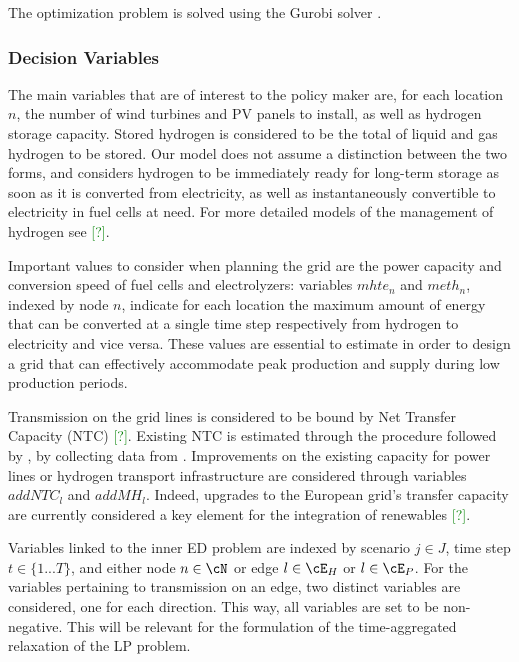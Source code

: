 The optimization problem is solved using the Gurobi solver \textcolor{green}{\cite{INTRO_gurobi}}.



\subsubsection{Decision Variables}

The main variables that are of interest to the policy maker are, for each location $n$, the number of wind turbines and PV panels to install, as well as hydrogen storage capacity.
Stored hydrogen is considered to be the total of liquid and gas hydrogen to be stored. 
Our model does not assume a distinction between the two forms, and considers hydrogen to be immediately ready for long-term storage as soon as it is converted from electricity, as well as instantaneously convertible to electricity in fuel cells at need. 
For more detailed models of the management of hydrogen see \textcolor{green}{[?]}.

Important values to consider when planning the grid are the power capacity and conversion speed of fuel cells and electrolyzers: variables $mhte_n$ and $meth_n$, indexed by node $n$, indicate for each location the maximum amount of energy that can be converted at a single time step respectively from hydrogen to electricity and vice versa. 
These values are essential to estimate in order to design a grid that can effectively accommodate peak production and supply during low production periods.

Transmission on the grid lines is considered to be bound by Net Transfer Capacity (NTC) \textcolor{green}{[?]}. 
Existing NTC is estimated through the procedure followed by \textcolor{green}{\cite{tesi_NTC}}, by collecting data from \textcolor{green}{\cite{entsoe_NTC}}. 
Improvements on the existing capacity for power lines or hydrogen transport infrastructure are considered through variables $addNTC_l$ and $addMH_l$.
Indeed, upgrades to the European grid's transfer capacity are currently considered a key element for the integration of renewables \textcolor{green}{[?]}.

Variables linked to the inner ED problem are indexed by scenario \(j\in J\), time step \(t\in\{1...T\}\), and either node \(n \in \cN\) or edge $l\in\cE_H$ or $l \in \cE_P$. 
For the variables pertaining to transmission on an edge, two distinct variables are considered, one for each direction. 
This way, all variables are set to be non-negative. This will be relevant for the formulation of the time-aggregated relaxation of the LP problem.

